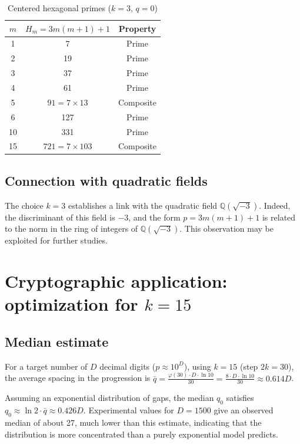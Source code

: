 \documentclass[11pt,a4paper]{article}
\theoremstyle{definition}
\theoremstyle{plain}
\newcommand{\Q}{\mathbb{Q}}
\begin{document}
\begin{table}[htbp]
\centering
\caption{Centered hexagonal primes ($k=3$, $q=0$)}\label{tab:hex-primes}
\begin{tabular}{@{}ccc@{}}
\toprule
$m$ & $H_m = 3m(m+1)+1$ & Property \\
\midrule
1 & 7 & Prime \\
2 & 19 & Prime \\
3 & 37 & Prime \\
4 & 61 & Prime \\
5 & $91 = 7 \times 13$ & Composite \\
6 & 127 & Prime \\
10 & 331 & Prime \\
15 & $721 = 7 \times 103$ & Composite \\
\bottomrule
\end{tabular}
\end{table}

\subsection{Connection with quadratic fields}

The choice $k=3$ establishes a link with the quadratic field $\Q(\sqrt{-3})$. Indeed, the discriminant of this field is $-3$, and the form $p = 3m(m+1)+1$ is related to the norm in the ring of integers of $\Q(\sqrt{-3})$. This observation may be exploited for further studies.

\section{Cryptographic application: optimization for $k=15$}

\subsection{Median estimate}

For a target number of $D$ decimal digits ($p \approx 10^D$), using $k=15$ (step $2k=30$), the average spacing in the progression is $\bar{q} = \frac{\varphi(30) \cdot D \cdot \ln 10}{30} = \frac{8 \cdot D \cdot \ln 10}{30} \approx 0.614 D$.

Assuming an exponential distribution of gaps, the median $q_0$ satisfies $q_0 \approx \ln 2 \cdot \bar{q} \approx 0.426 D$. Experimental values for $D=1500$ give an observed median of about 27, much lower than this estimate, indicating that the distribution is more concentrated than a purely exponential model predicts.
\end{document}

